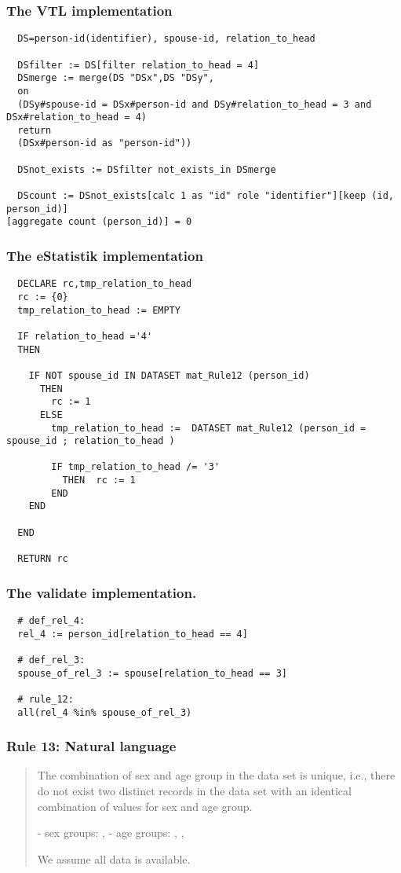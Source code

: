 \subsubsection*{The VTL implementation}
\begin{verbatim}
  DS=person-id(identifier), spouse-id, relation_to_head

  DSfilter := DS[filter relation_to_head = 4]
  DSmerge := merge(DS "DSx",DS "DSy",
  on
  (DSy#spouse-id = DSx#person-id and DSy#relation_to_head = 3 and
DSx#relation_to_head = 4)
  return
  (DSx#person-id as "person-id"))

  DSnot_exists := DSfilter not_exists_in DSmerge

  DScount := DSnot_exists[calc 1 as "id" role "identifier"][keep (id, person_id)]
[aggregate count (person_id)] = 0
\end{verbatim}
\subsubsection*{The eStatistik implementation}
\begin{verbatim}
  DECLARE rc,tmp_relation_to_head
  rc := {0}
  tmp_relation_to_head := EMPTY

  IF relation_to_head ='4'
  THEN   

    IF NOT spouse_id IN DATASET mat_Rule12 (person_id)
      THEN
        rc := 1
      ELSE
        tmp_relation_to_head :=  DATASET mat_Rule12 (person_id = spouse_id ; relation_to_head )

        IF tmp_relation_to_head /= '3'
          THEN  rc := 1
        END
    END

  END
  
  RETURN rc
\end{verbatim}
\subsubsection*{The validate implementation.}
\begin{verbatim}
  # def_rel_4:
  rel_4 := person_id[relation_to_head == 4]

  # def_rel_3:
  spouse_of_rel_3 := spouse[relation_to_head == 3]

  # rule_12:
  all(rel_4 %in% spouse_of_rel_3)
\end{verbatim}


\newpage

\subsubsection*{  Rule 13: Natural language}
\begin{quote}


The combination of sex and age group in the data set is unique, i.e., there do not exist two distinct records in
the data set with an identical combination of values for sex and age group.

- sex groups: , 
- age groups: , ,  

We assume all data is available.


\end{quote}
